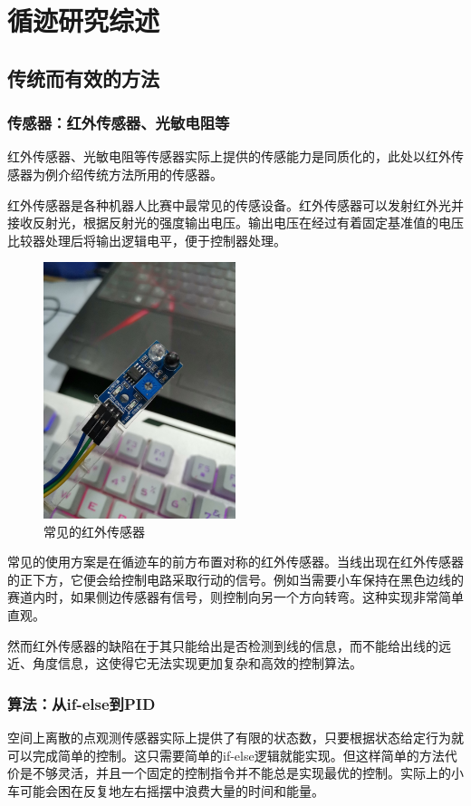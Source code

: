 \documentclass{report}
\begin{document}
\section{循迹研究综述}
\subsection{传统而有效的方法\cite{intro2023robot}}
\label{subsec:label}
\subsubsection{传感器：红外传感器、光敏电阻等}
\label{subsec:label}
红外传感器、光敏电阻等传感器实际上提供的传感能力是同质化的，此处以红外传感器为例介绍传统方法所用的传感器。

红外传感器是各种机器人比赛中最常见的传感设备。红外传感器可以发射红外光并接收反射光，根据反射光的强度输出电压。输出电压在经过有着固定基准值的电压比较器处理后将输出逻辑电平，便于控制器处理。
\begin{figure}[ht]
  \centering
  \includegraphics[width=0.5\textwidth]{figures/sensor.jpg}
  \caption{ 常见的红外传感器}
\end{figure}

常见的使用方案是在循迹车的前方布置对称的红外传感器。当线出现在红外传感器的正下方，它便会给控制电路采取行动的信号。例如当需要小车保持在黑色边线的赛道内时，如果侧边传感器有信号，则控制向另一个方向转弯。这种实现非常简单直观。

然而红外传感器的缺陷在于其只能给出是否检测到线的信息，而不能给出线的远近、角度信息，这使得它无法实现更加复杂和高效的控制算法。
\subsubsection{算法：从if-else到PID}
\label{subsec:label}
空间上离散的点观测传感器实际上提供了有限的状态数，只要根据状态给定行为就可以完成简单的控制。这只需要简单的if-else逻辑就能实现。但这样简单的方法代价是不够灵活，并且一个固定的控制指令并不能总是实现最优的控制。实际上的小车可能会困在反复地左右摇摆中浪费大量的时间和能量。
\end{document}
